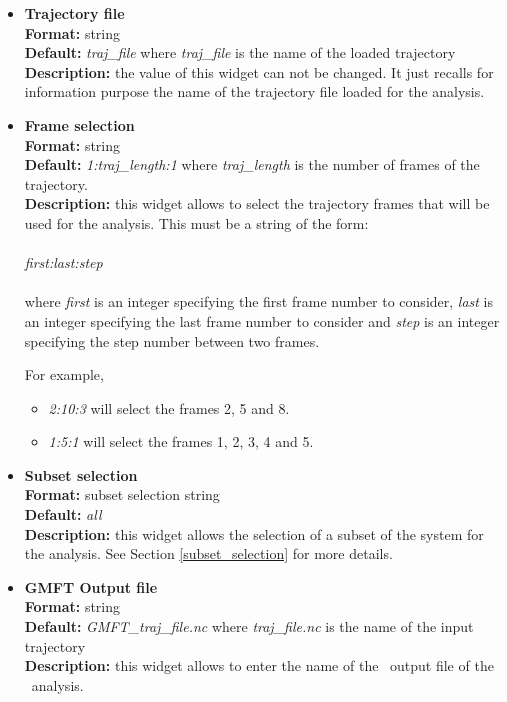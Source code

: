 \documentclass[a4paper,11pt]{report}
\begin{document}
\hypertarget{gmft_trajectory_file}{}
\begin{itemize}
\item \textbf{Trajectory file}\\
\textbf{Format:} string\\
\textbf{Default:} \textit{traj\_file} where \textit{traj\_file} is the name of the loaded trajectory\\
\textbf{Description:} the value of this widget can not be changed. It just recalls for information purpose the name
of the trajectory file loaded for the analysis.

\hypertarget{gmft_frame_selection}{}
\item \textbf{Frame selection}\\
\textbf{Format:} string\\
\textbf{Default:} \textit{1:traj\_length:1} where \textit{traj\_length} is the number of frames of the trajectory.\\
\textbf{Description:} this widget allows to select the trajectory frames that will be used for the analysis. This must
be a string of the form:
\\\\
\textit{first:last:step}
\\\\
where \textit{first} is an integer specifying the first frame number to consider, \textit{last} is an integer specifying the last 
frame number to consider and \textit{step} is an integer specifying the step number between two frames.

For example,
\begin{itemize}
\item \textit{2:10:3} will select the frames 2, 5 and 8.
\item \textit{1:5:1} will select the frames 1, 2, 3, 4 and 5.
\end{itemize}

\hypertarget{gmft_subset_selection}{}
\item \textbf{Subset selection}\\
\textbf{Format:} subset selection string\\
\textbf{Default:} \textit{all}\\
\textbf{Description:} this widget allows the selection of a subset of the system for the analysis. 
See Section \ref{subset_selection} for more details.

\hypertarget{gmft_gmft_output_file}{}
\item \textbf{GMFT Output file}\\
\textbf{Format:} string\\
\textbf{Default:} \textit{GMFT\_traj\_file.nc} where \textit{traj\_file.nc} is the name of the input trajectory\\
\textbf{Description:} this widget allows to enter the name of the \NetCDF\ output file of the \GMFT\ analysis.
\end{itemize}
\end{document}
